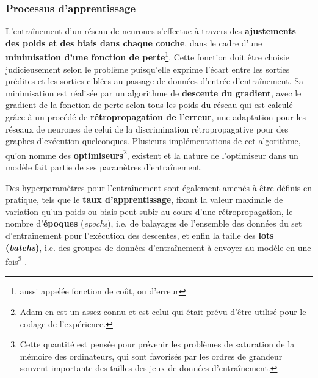 \documentclass[12pt, twoside]{report}
\begin{document}
\subsubsection{Processus d'apprentissage}
L'entraînement d'un réseau de neurones s'effectue à travers des \textbf{ajustements des poids et des biais dans chaque couche}, dans le cadre d'une \textbf{minimisation d'une fonction de perte}\footnote{aussi appelée fonction de coût, ou d'erreur}. Cette fonction doit être choisie judicieusement selon le problème puisqu'elle exprime l'écart entre les sorties prédites et les sorties ciblées au passage de données d'entrée d'entraînement. Sa minimisation est réalisée par un algorithme de \textbf{descente du gradient}, avec le gradient de la fonction de perte selon tous les poids du réseau qui est calculé grâce à un procédé de \textbf{rétropropagation de l'erreur}, une adaptation pour les réseaux de neurones de celui de la discrimination rétropropagative pour des graphes d'exécution quelconques. Plusieurs implémentations de cet algorithme, qu'on nomme des \textbf{optimiseurs}\footnote{Adam \autocite{kingma2017adam} en est un assez connu et est celui qui était prévu d'être utilisé pour le codage de l'expérience.}, existent et la nature de l'optimiseur dans un modèle fait partie de ses paramètres d'entraînement.

Des hyperparamètres pour l'entraînement sont également amenés à être définis en pratique, tels que le \textbf{taux d'apprentissage}, fixant la valeur maximale de variation qu'un poids ou biais peut subir au cours d'une rétropropagation, le nombre d'\textbf{époques} (\textit{epochs}), i.e. de balayages de l'ensemble des données du set d'entraînement pour l'exécution des descentes, et enfin la taille des \textbf{lots (\textit{batchs})}, i.e. des groupes de données d'entraînement à envoyer au modèle en une fois\footnote{Cette quantité est pensée pour prévenir les problèmes de saturation de la mémoire des ordinateurs, qui sont favorisés par les ordres de grandeur souvent importante des tailles des jeux de données d'entraînement.} \autocite[chap.~7, p.~17-23]{jurafsky}\autocite[21]{fourrier}.
\end{document}
